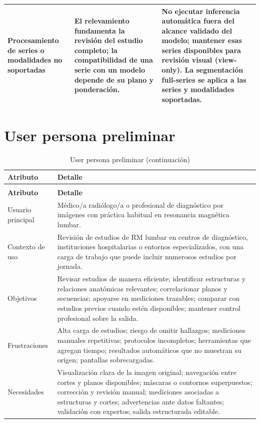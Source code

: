 {\begin{longtable}{>{\raggedright\arraybackslash}p{} >{\raggedright\arraybackslash}p{} >{\raggedright\arraybackslash}p{}}
Procesamiento de series o modalidades no soportadas & El relevamiento fundamenta la revisión del estudio completo; la compatibilidad de una serie con un modelo depende de su plano y ponderación. & No ejecutar inferencia automática fuera del alcance validado del modelo; mantener esas series disponibles para revisión visual (view-only). La segmentación full-series se aplica a las series y modalidades soportadas. \\
\hline
\end{longtable}
}

\section{User persona preliminar}

{\small
\setlength{\LTleft}{0pt}
\setlength{\LTright}{0pt}
\renewcommand{\arraystretch}{1.18}
\setlength{\tabcolsep}{3pt}
\begin{longtable}{>{\raggedright\arraybackslash}p{} >{\raggedright\arraybackslash}p{}}
\caption{User persona preliminar}\label{tab:user-persona}\\
\hline
\textbf{Atributo} & \textbf{Detalle} \\
\hline
\endfirsthead
\caption[]{User persona preliminar (continuación)}\\
\hline
\textbf{Atributo} & \textbf{Detalle} \\
\hline
\endhead
\hline
\endfoot
Usuario principal & Médico/a radiólogo/a o profesional de diagnóstico por imágenes con práctica habitual en resonancia magnética lumbar. \\
Contexto de uso & Revisión de estudios de RM lumbar en centros de diagnóstico, instituciones hospitalarias o entornos especializados, con una carga de trabajo que puede incluir numerosos estudios por jornada. \\
Objetivos & Revisar estudios de manera eficiente; identificar estructuras y relaciones anatómicas relevantes; correlacionar planos y secuencias; apoyarse en mediciones trazables; comparar con estudios previos cuando estén disponibles; mantener control profesional sobre la salida. \\
Frustraciones & Alta carga de estudios; riesgo de omitir hallazgos; mediciones manuales repetitivas; protocolos incompletos; herramientas que agregan tiempo; resultados automáticos que no muestran su origen; pantallas sobrecargadas. \\
Necesidades & Visualización clara de la imagen original; navegación entre cortes y planos disponibles; máscaras o contornos superpuestos; corrección y revisión manual; mediciones asociadas a estructuras y cortes; advertencias ante datos faltantes; validación con expertos; salida estructurada editable. \\

\end{longtable}}
